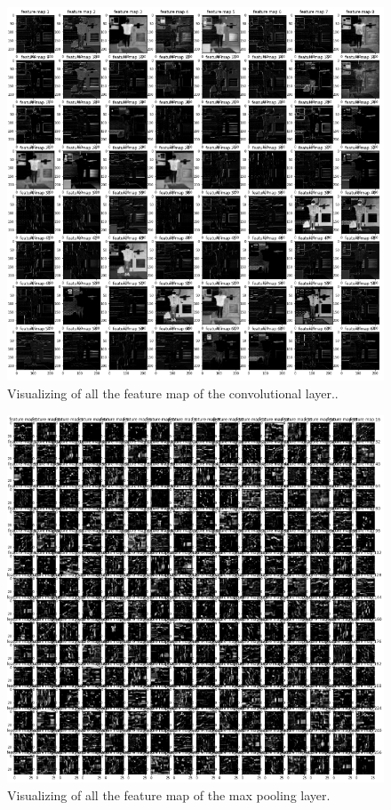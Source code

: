 	
\begin{figure}[ht]
\centering
\includegraphics[angle=90,origin=c,width=1\columnwidth]{Figures/convnetFeatureMap.PNG}
\decoRule
\caption[Visualizing of all the feature map of the convolutional layer.]{ Visualizing of all the feature map of the convolutional layer..}
\label{fig:accuracycomparison2}
\end{figure}


\begin{figure}[ht]
\centering
\includegraphics[angle=90,origin=c,width=1\columnwidth]{Figures/maxpoolingFeaturemap.PNG}
\decoRule
\caption[Visualizing of all the feature map of the max pooling layer.]{ Visualizing of all the feature map of the max pooling layer.}
\label{fig:accuracycomparison2}
\end{figure}




